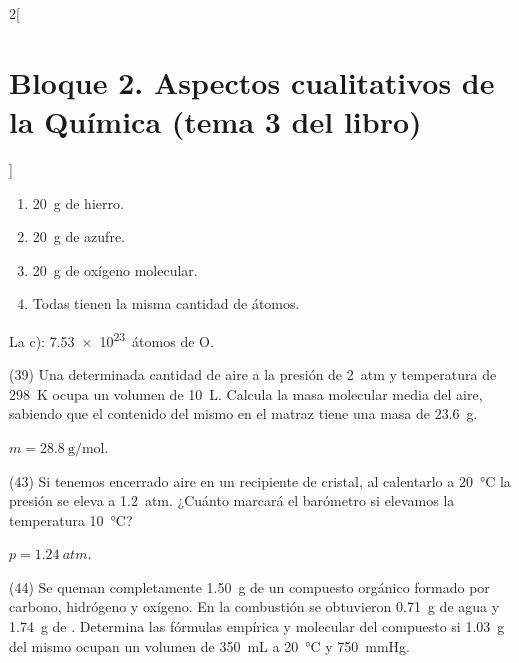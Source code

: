 \documentclass[10pt]{article}
\begin{document}
\begin{multicols}{2}[
    \section{Bloque 2. Aspectos cualitativos de la Química (tema 3 del libro)}
  ]
\begin{exercise}[
    tags    = {},
    topics  = {química,química básica},
    source  = {FQ 1B MGH 2016, p85, e38},
  ]
  \begin{enumerate}
    \item \SI{20}{\gram} de hierro.
    \item \SI{20}{\gram} de azufre.
    \item \SI{20}{\gram} de oxígeno molecular.
    \item Todas tienen la misma cantidad de átomos.
  \end{enumerate}
\end{exercise}

\begin{solution}
  La c): \SI{7.53e23}{átomos} de O.
\end{solution}




\begin{exercise}[
    tags    = {},
    topics  = {química,química básica},
    source  = {FQ 1B MGH 2016, p85, e39},
  ]
  (39) Una determinada cantidad de aire a la presión de \SI{2}{atm} y
  temperatura de \SI{298}{\kelvin} ocupa un volumen de \SI{10}{\liter}. Calcula la masa molecular media del aire, sabiendo que el contenido del
  mismo en el matraz tiene una masa de \SI{23.6}{\gram}.
\end{exercise}

\begin{solution}
  \( m = \SI{28.8}{\gram\per\mole} \).
\end{solution}




\begin{exercise}[
    tags    = {},
    topics  = {química,química básica},
    source  = {FQ 1B MGH 2016, p86, e43},
  ]
  (43) Si tenemos encerrado aire en un recipiente de cristal, al
  calentarlo a \SI{20}{\celsius} la presión se eleva a \SI{1.2}{atm}. ¿Cuánto marcará el barómetro si elevamos la temperatura \SI{10}{\celsius}?
\end{exercise}

\begin{solution}
  \( p = \SI{1.24}{atm} \).
\end{solution}




\begin{exercise}[
    tags    = {},
    topics  = {química,química básica},
    source  = {FQ 1B MGH 2016, p86, e44},
  ]
  (44) Se queman completamente \SI{1.50}{\gram} de un compuesto orgánico
  formado por carbono, hidrógeno y oxígeno. En la combustión
  se obtuvieron \SI{0.71}{\gram} de agua y \SI{1.74}{\gram} de . Determina las fórmulas empírica y molecular del compuesto si
  \SI{1.03}{\gram} del mismo ocupan un volumen de \SI{350}{\milli\liter} a \SI{20}{\celsius} y \SI{750}{\mmHg}.
\end{exercise}


\end{multicols}
\end{document}
